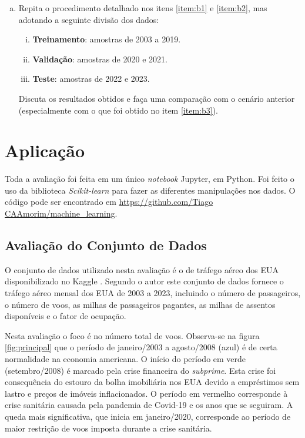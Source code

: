 \documentclass[final,5p]{elsarticle}
\numberwithin{equation}{section}
\begin{document}
\begin{enumerate}[(a)]
        \item Repita o procedimento detalhado nos itens \ref{item:b1} e \ref{item:b2}, mas adotando a seguinte divisão dos dados:

        \begin{enumerate}[(i)]
            \item \textbf{Treinamento}: amostras de 2003 a 2019.
            \item \textbf{Validação}: amostras de 2020 e 2021.
            \item \textbf{Teste}: amostras de 2022 e 2023.
        \end{enumerate}

        Discuta os resultados obtidos e faça uma comparação com o cenário anterior (especialmente
        com o que foi obtido no item \ref{item:b3}).
    \end{enumerate}

\section{Aplicação}

    Toda a avaliação foi feita em um único \emph{notebook} Jupyter, em Python. Foi feito o uso da biblioteca \emph{Scikit-learn} \cite{scikit-learn} para fazer as diferentes manipulações nos dados. O código pode ser encontrado em \href{https://github.com/TiagoCAAmorim/machine_learning/blob/main/Lista01/Lista01.ipynb}{https://github.com/Tiago CAAmorim/machine\_learning}.

    \subsection{Avaliação do Conjunto de Dados}

    O conjunto de dados utilizado nesta avaliação é o de tráfego aéreo dos EUA disponibilizado no Kaggle \cite{YYXian_2024}. Segundo o autor este conjunto de dados fornece o tráfego aéreo mensal dos EUA de 2003 a 2023, incluindo o número de passageiros, o número de voos, as milhas de passageiros pagantes, as milhas de assentos disponíveis e o fator de ocupação.

    Nesta avaliação o foco é no número total de voos. Observa-se na figura \ref{fig:principal} que o período de janeiro/2003 a agosto/2008 (azul) é de certa normalidade na economia americana. O início do período em verde (setembro/2008) é marcado pela crise financeira do \emph{subprime}. Esta crise foi consequência do estouro da bolha imobiliária nos EUA devido a empréstimos sem lastro e preços de imóveis inflacionados. O período em vermelho corresponde à crise sanitária causada pela pandemia de Covid-19 e os anos que se seguiram. A queda mais significativa, que inicia em janeiro/2020, corresponde ao período de maior restrição de voos imposta durante a crise sanitária.
\end{document}
